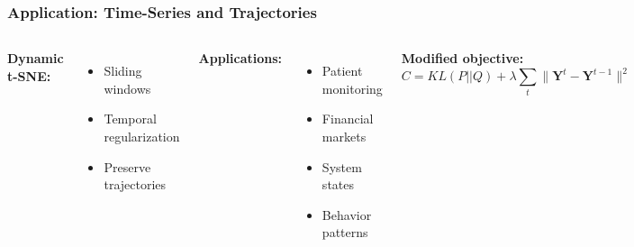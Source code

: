 \documentclass[aspectratio=169]{beamer}
\begin{document}
\begin{frame}
\frametitle{Application: Time-Series and Trajectories}
\begin{columns}[T]
\textbf{Dynamic t-SNE:}
\begin{itemize}
\small
\item Sliding windows
\item Temporal regularization
\item Preserve trajectories
\end{itemize}

\vspace{0.3cm}
\textbf{Applications:}
\begin{itemize}
\small
\item Patient monitoring
\item Financial markets
\item System states
\item Behavior patterns
\end{itemize}

\vspace{0.3cm}
\textbf{Modified objective:}
$$C = KL(P||Q) + \lambda \sum_t \|\mathbf{Y}^t - \mathbf{Y}^{t-1}\|^2$$

\begin{center}
\end{center}

\textbf{Challenge:}\\
\small Balance stability vs. change
\end{columns}
\end{frame}
\end{document}
